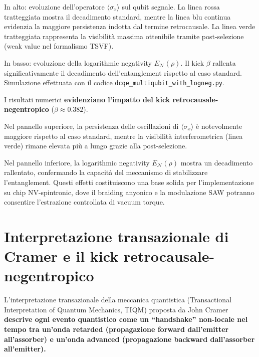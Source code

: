 \documentclass[11pt,a4paper]{article}
\let\oldcite\cite
\renewcommand{\cite}{\protect\oldcite}
\theoremstyle{plain}
\theoremstyle{definition}
\begin{document}
In alto: evoluzione dell'operatore $\langle\sigma_x\rangle$ sul qubit segnale. La linea rossa tratteggiata mostra il decadimento standard, mentre la linea blu continua evidenzia la maggiore persistenza indotta dal termine retrocausale. La linea verde tratteggiata rappresenta la visibilità massima ottenibile tramite post-selezione (weak value nel formalismo TSVF). 

\vspace{0.4cm}


In basso: evoluzione della logarithmic negativity $E_{\mathcal{N}}(\rho)$. Il kick $\beta$ rallenta significativamente il decadimento dell'entanglement rispetto al caso standard. 
Simulazione effettuata con il codice \texttt{dcqe\_multiqubit\_with\_logneg.py}.

\vspace{0.6cm}




I risultati numerici \textbf{evidenziano l'impatto del kick retrocausale-negentropico} ($\beta \approx 0.382$). 

\vspace{0.5cm}


Nel pannello superiore, la persistenza delle oscillazioni di $\langle\sigma_x\rangle$ è notevolmente maggiore rispetto al caso standard, mentre la visibilità interferometrica (linea verde) rimane elevata più a lungo grazie alla post-selezione. 


\vspace{0.4cm}


Nel pannello inferiore, la logarithmic negativity $E_{\mathcal{N}}(\rho)$ mostra un decadimento rallentato, confermando la capacità del meccanismo di stabilizzare l'entanglement. Questi effetti costituiscono una base solida per l'implementazione su chip NV-spintronic, dove il braiding anyonico e la modulazione SAW potranno consentire l'estrazione controllata di vacuum torque.



\vspace{0.4cm}




\section{Interpretazione transazionale di Cramer e il kick retrocausale-negentropico}


\vspace{0.2cm}

L'interpretazione transazionale della meccanica quantistica (Transactional Interpretation of Quantum Mechanics, TIQM) proposta da John Cramer \cite{cramer_transactional_1986} \textbf{descrive ogni evento quantistico come un ``handshake'' non-locale nel tempo tra un'onda retarded (propagazione forward dall'emitter all'assorber) e un'onda advanced (propagazione backward dall'assorber all'emitter). }
\end{document}
